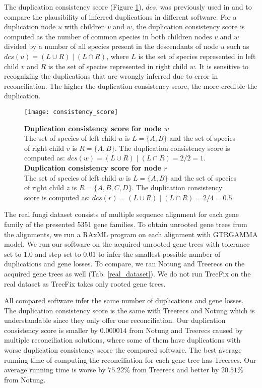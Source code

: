 The duplication consistency score (Figure \ref{consistency_score}), $dcs$, was previously used in \cite{treebest} and \cite{spimap} to compare the plausibility of inferred duplications in different software. For a duplication node $u$ with children $v$ and $w$, the duplication consistency score is computed as the number of common species in both children nodes $v$ and $w$ divided by a number of all species present in the descendants of node $u$ such as $dcs(u) = (L \cup R) \mid (L \cap R)$, where $L$ is the set of species represented in left child $v$ and $R$ is the set of species represented in right child $w$. It is sensitive to recognizing the duplications that are wrongly inferred due to error in reconciliation. The higher the duplication consistency score, the more credible the duplication.

\begin{figure}[ht!]
	\centering
	\label{consistency_score}
  	\texttt{[image: consistency\_score]}
  	\caption[Duplication consistency score]{\textbf{Duplication consistency score for node $w$}\\
  	The set of species of left child $u$ is $L = \{A, B\}$ and the set of species of right child $v$ is $R = \{A, B\}$. The duplication consistency score is computed as: $dcs(w) = (L \cup R) \mid (L \cap R) = 2 / 2 = 1$.
  	\\
  	\textbf{Duplication consistency score for node $r$}\\
  	The set of species of left child $w$ is $L = \{A, B\}$ and the set of species of right child $z$ is $R = \{A, B, C, D\}$. The duplication consistency score is computed as: $dcs(r) = (L \cup R) \mid (L \cap R) = 2 / 4 = 0.5$.}
\end{figure}

The real fungi dataset consists of multiple sequence alignment for each gene family of the presented 5351 gene families. To obtain unrooted gene trees from the alignments, we run a RAxML program on each alignment with GTRGAMMA model. We run our software on the acquired unrooted gene trees with tolerance set to $1.0$ and step set to $0.01$ to infer the smallest possible number of duplications and gene losses. To compare, we ran Notung and Treerecs on the acquired gene trees as well (Tab. \ref{real_dataset}). We do not run TreeFix on the real dataset as TreeFix takes only rooted gene trees.

All compared software infer the same number of duplications and gene losses. The duplication consistency score is the same with Treerecs and Notung which is understandable since they only offer one reconciliation. Our duplication consistency score is smaller by $0.000014$ from Notung and Treerecs caused by multiple reconciliation solutions, where some of them have duplications with worse duplication consistency score the compared software. The best average running time of computing the reconciliation for each gene tree has Treerecs. Our average running time is worse by $75.22\%$ from Treerecs and better by $20.51\%$ from Notung.


